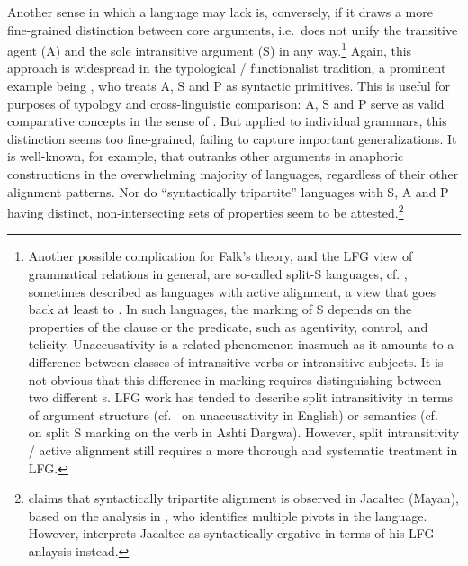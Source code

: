 \documentclass[output=paper]{../langscibook}
\begin{document}
Another sense in which a language may lack \GFHAT is, conversely, if it draws a more fine-grained distinction between core arguments, i.e.\ does not unify the transitive agent (A) and the sole intransitive argument (S) in any way.\footnote{Another possible complication for Falk's theory, and the LFG view of grammatical relations in general, are so-called split-S languages, cf. \citet{VanValin1990}, sometimes described as languages with active alignment, a view that goes back at least to \citet{Sapir:Incorporation}. In such languages, the marking of S depends on the properties of the clause or the predicate, such as agentivity, control, and telicity. Unaccusativity \citep{Perlmutter1978} is a related phenomenon inasmuch as it amounts to a difference between classes of intransitive verbs or intransitive subjects. It is not obvious that this difference in marking requires distinguishing between two different {\GF}s. LFG work has tended to describe split intransitivity in terms of argument structure (cf.\ \citealt{bresnanzaenen90} on unaccusativity in English) or semantics (cf.\  \citealt{belyaev20}  on split S marking on the verb in Ashti Dargwa). However, split intransitivity / active alignment still requires a more thorough and systematic treatment in LFG.} Again, this approach is widespread in the typological / functionalist tradition, a prominent example being \citet{Dixon1984}, who treats A, S and P as syntactic primitives. This is useful for purposes of typology and cross-linguistic comparison: A, S and P serve as valid comparative concepts in the sense of \citet{haspelmath2010}. But applied to individual grammars, this distinction seems too fine-grained, failing to capture important generalizations. It is well-known, for example, that \GFHAT outranks other arguments in anaphoric constructions in the overwhelming majority of languages, regardless of their other alignment patterns. Nor do ``syntactically tripartite'' languages with S, A and P having distinct, non-intersecting sets of properties seem to be attested.\footnote{\citet[323-326]{Kibrik97} claims that syntactically tripartite alignment is observed in Jacaltec (Mayan), based on the analysis in \citet{VanValin:Ergative}, who identifies multiple pivots in the language. However, \citet[93-94]{falk06} interprets Jacaltec as syntactically ergative in terms of his LFG anlaysis instead.} 
 
\end{document}
